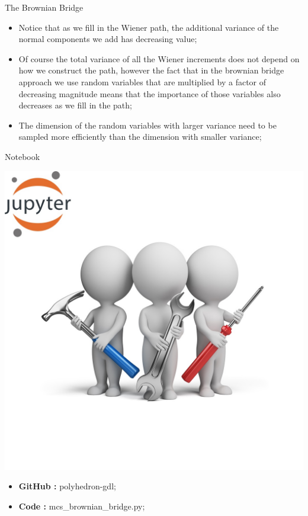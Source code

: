 \documentclass[11pt]{beamer}
\begin{document}
\begin{frame}{The Brownian Bridge}
\begin{itemize}
\item Notice that as we fill in the Wiener path, the additional variance of the normal components we add  has decreasing value;
\item Of course the total variance of all the Wiener increments does not depend on how we construct the path, however the fact that in the brownian bridge approach we use random variables that are multiplied by a factor of decreasing magnitude means that the importance of those variables also decreases as we fill in the path;
\item The dimension of the random variables with larger variance need to be sampled more efficiently than the dimension with smaller variance;
\end{itemize}
\end{frame}
\begin{frame}{Notebook}
\noindent\begin{minipage}{0.5\textwidth}%
\includegraphics[width=\linewidth]{img/exercise.jpg}
\end{minipage}%
\hfill%
\begin{minipage}{0.5\textwidth}
\begin{itemize}
\item {\bf GitHub        : }    polyhedron-gdl;
\item {\bf Code          : }    mcs\_brownian\_bridge.py;
\end{itemize}
\end{minipage}
\end{frame}
\end{document}
